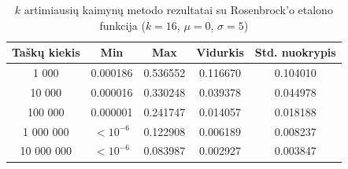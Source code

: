 \begin{table}[H]
    \centering
    \begin{tabular}{|c|c|c|c|c|}
        \hline
        \textbf{Taškų kiekis} & \textbf{Min} & \textbf{Max} & \textbf{Vidurkis} & \textbf{Std. nuokrypis} \\ \hline
        1 000        & 0.000186 & 0.536552 & 0.116670 & 0.104010 \\ \hline
        10 000       & 0.000016 & 0.330248 & 0.039378 & 0.044978 \\ \hline
        100 000      & 0.000001 & 0.241747 & 0.014057 & 0.018188 \\ \hline
        1 000 000    & $<10^{-6}$ & 0.122908 & 0.006189 & 0.008237 \\ \hline
        10 000 000   & $<10^{-6}$ & 0.083987 & 0.002927 & 0.003847 \\ \hline
    \end{tabular}
    \caption{$k$ artimiausių kaimynų metodo rezultatai su Rosenbrock'o etalono funkcija ($k = 16$, $\mu = 0$, $\sigma = 5$)}
\end{table}